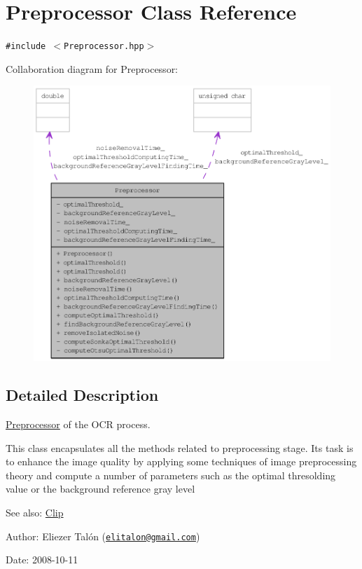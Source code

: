 \hypertarget{class_preprocessor}{
\section{Preprocessor Class Reference}
\label{class_preprocessor}
}
{\tt \#include $<$Preprocessor.hpp$>$}

Collaboration diagram for Preprocessor:\nopagebreak
\begin{figure}[H]
\begin{center}
\leavevmode
\includegraphics[width=400pt]{class_preprocessor__coll__graph}
\end{center}
\end{figure}


\subsection{Detailed Description}
\hyperlink{class_preprocessor}{Preprocessor} of the OCR process. 

This class encapsulates all the methods related to preprocessing stage. Its task is to enhance the image quality by applying some techniques of image preprocessing theory and compute a number of parameters such as the optimal thresolding value or the background reference gray level

\begin{Desc}
\item[See also:]\hyperlink{class_clip}{Clip}\end{Desc}
\begin{Desc}
\item[Author:]Eliezer Talón (\href{mailto:elitalon@gmail.com}{\tt elitalon@gmail.com}) \end{Desc}
\begin{Desc}
\item[Date:]2008-10-11 \end{Desc}


